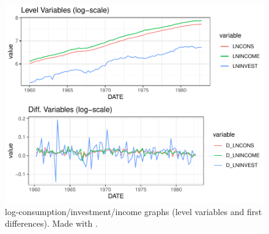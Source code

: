 \begin{center}
\begin{figure}[htbp!]
        \centering
        \includegraphics[scale=0.8]{figures/tsgraph.pdf}
        \caption{log-consumption/investment/income graphs (level variables and first differences). Made with .}
        \label{fig:plotemp}

\end{figure}
\end{center}

